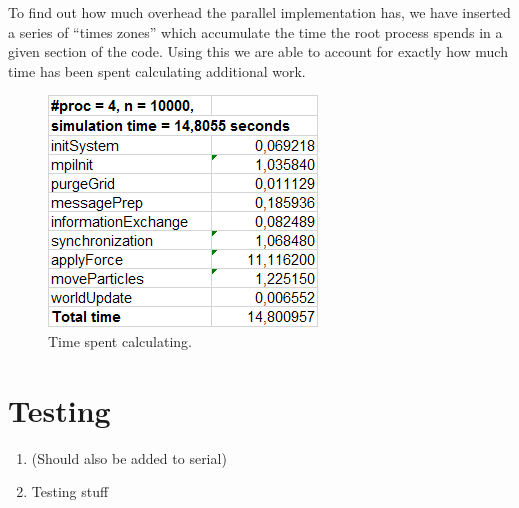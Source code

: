To find out how much overhead the parallel implementation has, we have inserted a series of ``times zones'' which accumulate the time the root process spends in a given section of the code. Using this we are able to account for exactly how much time has been spent calculating additional work.

\begin{figure}[H]
  \centering
  \begin{minipage}[b]{0.6\textwidth}
    \includegraphics[width=\textwidth]{time.png}
    \caption{Time spent calculating.}
  \end{minipage}
\end{figure}

\section{Testing}
\begin{enumerate}
  \item{(Should also be added to serial)}
  \item Testing stuff
\end{enumerate}